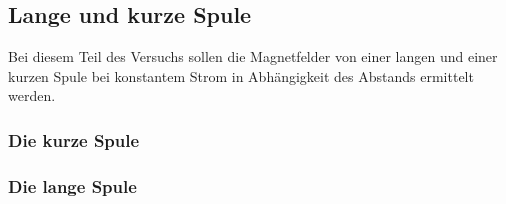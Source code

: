 \subsection{Lange und kurze Spule}
Bei diesem Teil des Versuchs sollen die Magnetfelder von einer langen und einer kurzen Spule bei konstantem Strom in Abhängigkeit 
des Abstands ermittelt werden.


\subsubsection{Die kurze Spule}

\subsubsection{Die lange Spule}